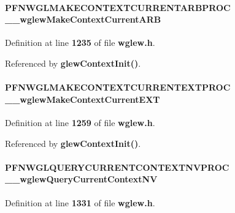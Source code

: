 \paragraph[{\+\_\+\+\_\+wglew\+Make\+Context\+Current\+A\+RB}]{ P\+F\+N\+W\+G\+L\+M\+A\+K\+E\+C\+O\+N\+T\+E\+X\+T\+C\+U\+R\+R\+E\+N\+T\+A\+R\+B\+P\+R\+OC \+\_\+\+\_\+wglew\+Make\+Context\+Current\+A\+RB}\label{wglew_8h_a14619eb31675004b03cb67f650977b48}


Definition at line {\bf 1235} of file {\bf wglew.\+h}.



Referenced by {\bf glew\+Context\+Init()}.

\paragraph[{\+\_\+\+\_\+wglew\+Make\+Context\+Current\+E\+XT}]{ P\+F\+N\+W\+G\+L\+M\+A\+K\+E\+C\+O\+N\+T\+E\+X\+T\+C\+U\+R\+R\+E\+N\+T\+E\+X\+T\+P\+R\+OC \+\_\+\+\_\+wglew\+Make\+Context\+Current\+E\+XT}\label{wglew_8h_a3c736b3d7b8f8f9aac08daa31f5beb7f}


Definition at line {\bf 1259} of file {\bf wglew.\+h}.



Referenced by {\bf glew\+Context\+Init()}.

\paragraph[{\+\_\+\+\_\+wglew\+Query\+Current\+Context\+NV}]{ P\+F\+N\+W\+G\+L\+Q\+U\+E\+R\+Y\+C\+U\+R\+R\+E\+N\+T\+C\+O\+N\+T\+E\+X\+T\+N\+V\+P\+R\+OC \+\_\+\+\_\+wglew\+Query\+Current\+Context\+NV}\label{wglew_8h_a5f8550d082f207f3046e3d6eed12a282}


Definition at line {\bf 1331} of file {\bf wglew.\+h}.



